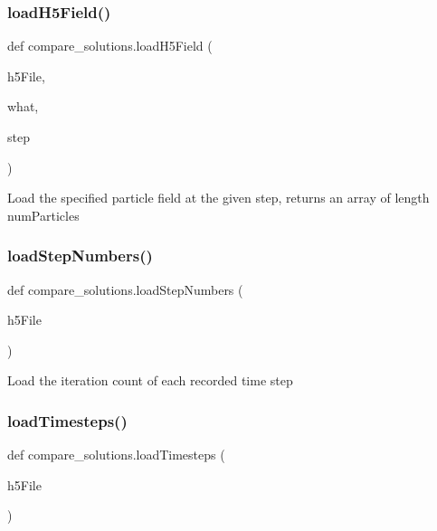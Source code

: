 \subsubsection{\texorpdfstring{load\+H5\+Field()}{loadH5Field()}}
{\footnotesize\ttfamily def compare\+\_\+solutions.\+load\+H5\+Field (\begin{DoxyParamCaption}\item[{}]{h5\+File,  }\item[{}]{what,  }\item[{}]{step }\end{DoxyParamCaption})}

\begin{DoxyVerb}Load the specified particle field at the given step, returns an array of length numParticles \end{DoxyVerb}
 \mbox{\label{namespacecompare__solutions_a3e94566cadb571133ea525491b2e573e}} 
\subsubsection{\texorpdfstring{load\+Step\+Numbers()}{loadStepNumbers()}}
{\footnotesize\ttfamily def compare\+\_\+solutions.\+load\+Step\+Numbers (\begin{DoxyParamCaption}\item[{}]{h5\+File }\end{DoxyParamCaption})}

\begin{DoxyVerb}Load the iteration count of each recorded time step \end{DoxyVerb}
 \mbox{\label{namespacecompare__solutions_a027a643ca4b78f4096ae7c990da396d4}} 
\subsubsection{\texorpdfstring{load\+Timesteps()}{loadTimesteps()}}
{\footnotesize\ttfamily def compare\+\_\+solutions.\+load\+Timesteps (\begin{DoxyParamCaption}\item[{}]{h5\+File }\end{DoxyParamCaption})}

